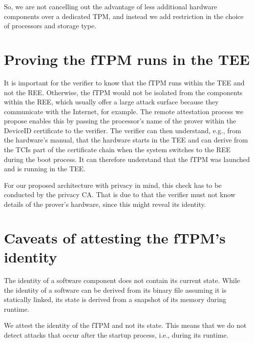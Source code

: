 So, we are not cancelling out the advantage of less additional hardware components over a dedicated TPM, and instead we add restriction in the choice of processors and storage type.




\section{Proving the fTPM runs in the TEE}

It is important for the verifier to know that the fTPM runs within the TEE and not the REE\@.
Otherwise, the fTPM would not be isolated from the components within the REE, which usually offer a large attack surface because they communicate with the Internet, for example.
The remote attestation process we propose enables this by passing the processor's name of the prover within the DeviceID certificate to the verifier.
The verifier can then understand, e.g., from the hardware's manual, that the hardware starts in the TEE and can derive from the TCIs part of the certificate chain when the system switches to the REE during the boot process.
It can therefore understand that the fTPM was launched and is running in the TEE\@.

For our proposed architecture with privacy in mind, this check has to be conducted by the privacy CA\@.
That is due to that the verifier must not know details of the prover's hardware, since this might reveal its identity.

\section{Caveats of attesting the fTPM's identity}

The identity of a software component does not contain its current state.
While the identity of a software can be derived from its binary file assuming it is statically linked, its state is derived from a snapshot of its memory during runtime.

We attest the identity of the fTPM and not its state.
This means that we do not detect attacks that occur after the startup process, i.e., during its runtime.
